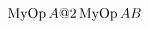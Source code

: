 \documentclass{article}
\makeatletter
\DeclareMathOperator{\myop}{MyOp}
\newcommand{\dubsub}[3]{\noexpandarg
  \StrSubstitute{#1}{@1}{#2}[\temp] \expandarg\temp\StrSubstitute{\temp}{@2}{#3}
}
\makeatother
\begin{document}
$\dubsub{\myop @1 @2}{A}{B}$
\end{document}

